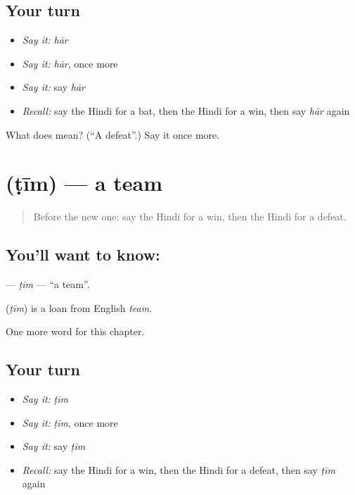 \subsection*{Your turn}
\begin{itemize}
\raggedright
  \item \emph{Say it:} \emph{hār}
  \item \emph{Say it:} \emph{hār}, once more
  \item \emph{Say it:} say \emph{hār}
  \item \emph{Recall:} say the Hindi for a bat, then the Hindi for a win, then say \emph{hār} again
\end{itemize}

\begin{tcolorbox}[breakable,colback=teal!4,colframe=teal!35!black,title={Before you move on}]
What does  mean? (\textquotedblleft{}A defeat\textquotedblright{}.) Say it once more.
\end{tcolorbox}
\section[\texorpdfstring{\hi{टीम} (ṭīm)}{टीम (ṭīm)}]{ (ṭīm) — a team}

\label{lesson:HI-C224-tim}



\begin{quote}
Before the new one: say the Hindi for a win, then the Hindi for a defeat.
\end{quote}

\subsection*{You'll want to know: }
\textbf{} — \emph{ṭīm} — \textquotedblleft{}a team\textquotedblright{}.

\begin{cousinweb}
\textbf{} (\emph{ṭīm}) is a loan from English \emph{team}.
\end{cousinweb}

\begin{grammarlens}[title={What you've built}]
One more word for this chapter.
\end{grammarlens}

\subsection*{Your turn}
\begin{itemize}
\raggedright
  \item \emph{Say it:} \emph{ṭīm}
  \item \emph{Say it:} \emph{ṭīm}, once more
  \item \emph{Say it:} say \emph{ṭīm}
  \item \emph{Recall:} say the Hindi for a win, then the Hindi for a defeat, then say \emph{ṭīm} again
\end{itemize}

